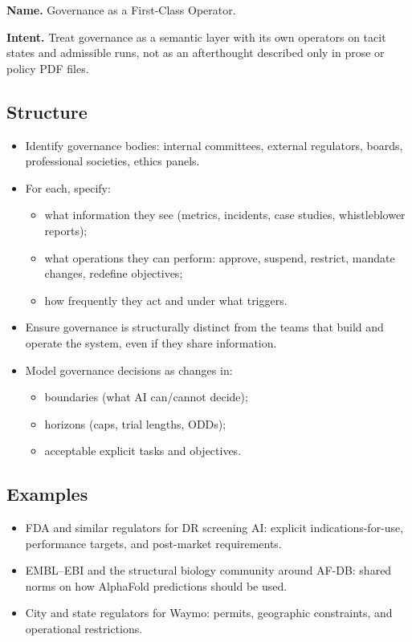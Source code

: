 \textbf{Name.} Governance as a First-Class Operator.

\textbf{Intent.} Treat governance as a semantic layer with its own
operators on tacit states and admissible runs, not as an afterthought
described only in prose or policy PDF files.

\subsection*{Structure}

\begin{itemize}
  \item Identify governance bodies:
        internal committees, external regulators, boards, professional
        societies, ethics panels.
  \item For each, specify:
        \begin{itemize}
          \item what information they see (metrics, incidents,
                case studies, whistleblower reports);
          \item what operations they can perform:
                approve, suspend, restrict, mandate changes, redefine
                objectives;
          \item how frequently they act and under what triggers.
        \end{itemize}
  \item Ensure governance is structurally distinct from the teams that
        build and operate the system, even if they share information.
  \item Model governance decisions as changes in:
        \begin{itemize}
          \item boundaries (what AI can/cannot decide);
          \item horizons (caps, trial lengths, ODDs);
          \item acceptable explicit tasks and objectives.
        \end{itemize}
\end{itemize}

\subsection*{Examples}

\begin{itemize}
  \item FDA and similar regulators for DR screening AI:
        explicit indications-for-use, performance targets, and
        post-market requirements.
  \item EMBL--EBI and the structural biology community around AF-DB:
        shared norms on how AlphaFold predictions should be used.
  \item City and state regulators for Waymo:
        permits, geographic constraints, and operational restrictions.
\end{itemize}

